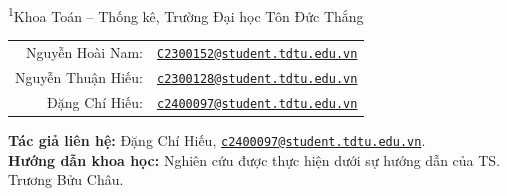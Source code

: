 \documentclass[12pt,a4paper]{article}
\makeatletter
\numberwithin{equation}{section}
\newcommand{\TacGiaMot}{Nguyễn Hoài Nam}
\newcommand{\EmailMot}{C2300152@student.tdtu.edu.vn}
\newcommand{\TacGiaHai}{Nguyễn Thuận Hiếu}
\newcommand{\EmailHai}{c2300128@student.tdtu.edu.vn}
\newcommand{\TacGiaBa}{Đặng Chí Hiếu}
\newcommand{\EmailBa}{c2400097@student.tdtu.edu.vn}
\newcommand{\DonViCongTac}{Khoa Toán -- Thống kê, Trường Đại học Tôn Đức Thắng}
\newcommand{\GiangVienHuongDan}{TS. Trương Bửu Châu}
\makeatother
\begin{document}
\begin{titlepage}
\begin{center}
        \vspace{0.42cm}
        {\small\textsuperscript{1}\DonViCongTac}\par
        \vspace{0.50cm}
        \begin{tabular}{@{}r@{\ }l@{}}
            \TacGiaMot: & \href{mailto:\EmailMot}{\nolinkurl{\EmailMot}} \\
            \TacGiaHai: & \href{mailto:\EmailHai}{\nolinkurl{\EmailHai}} \\
            \TacGiaBa: & \href{mailto:\EmailBa}{\nolinkurl{\EmailBa}} \\
        \end{tabular}
    \end{center}

    \vspace{1.15cm}
    \par\noindent{\color{CoverRule}\rule{\linewidth}{0.5pt}}
    \vspace{0.45cm}

    \noindent\begin{minipage}{\linewidth}
        \small
        \textbf{Tác giả liên hệ:} \TacGiaBa,
        \href{mailto:\EmailBa}{\nolinkurl{\EmailBa}}.\\[0.35em]
        \textbf{Hướng dẫn khoa học:} Nghiên cứu được thực hiện dưới sự hướng dẫn của \GiangVienHuongDan. 
    \end{minipage}

    \vfill
    \noindent{\color{CoverNavy}\rule{\linewidth}{1pt}}
    \vspace{0.15cm}

    \noindent
\end{titlepage}


\pagestyle{preliminary}
\setcounter{page}{1}
\end{document}
